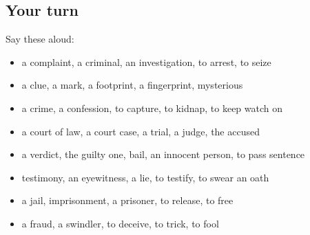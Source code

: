 \subsection*{Your turn}
Say these aloud:

\begin{itemize}
\raggedright
  \item a complaint, a criminal, an investigation, to arrest, to seize
  \item a clue, a mark, a footprint, a fingerprint, mysterious
  \item a crime, a confession, to capture, to kidnap, to keep watch on
  \item a court of law, a court case, a trial, a judge, the accused
  \item a verdict, the guilty one, bail, an innocent person, to pass sentence
  \item testimony, an eyewitness, a lie, to testify, to swear an oath
  \item a jail, imprisonment, a prisoner, to release, to free
  \item a fraud, a swindler, to deceive, to trick, to fool
\end{itemize}

